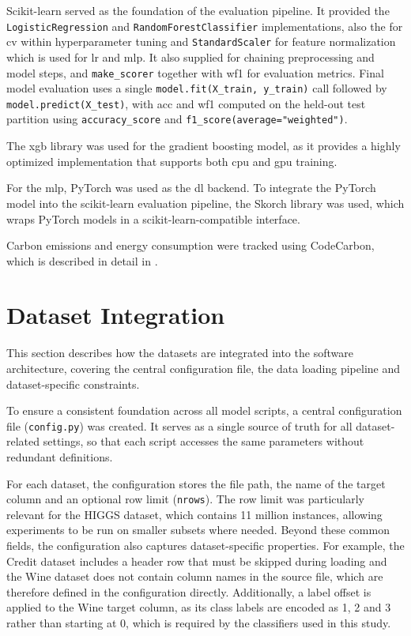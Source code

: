 Scikit-learn served as the foundation of the evaluation pipeline. It provided the \texttt{LogisticRegression} and \texttt{RandomForestClassifier} implementations, also the  for \gls{cv} within hyperparameter tuning and \texttt{StandardScaler} for feature normalization which is used for \gls{lr} and \gls{mlp}. It also supplied  for chaining preprocessing and model steps, and \texttt{make\_scorer} together with \gls{wf1} for evaluation metrics. Final model evaluation uses a single \texttt{model.fit(X\_train, y\_train)} call followed by \texttt{model.predict(X\_test)}, with \gls{acc} and \gls{wf1} computed on the held-out test partition using \texttt{accuracy\_score} and \texttt{f1\_score(average="weighted")}.

The \gls{xgb} library was used for the gradient boosting model, as it provides a highly optimized implementation that supports both \gls{cpu} and \gls{gpu} training.

For the \gls{mlp}, PyTorch \cite{paszkePyTorchImperativeStyle2019} was used as the \gls{dl} backend. To integrate the PyTorch model into the scikit-learn evaluation pipeline, the Skorch library \cite{ghoshSkorchBridgePyTorch2024} was used, which wraps PyTorch models in a scikit-learn-compatible interface.

Carbon emissions and energy consumption were tracked using CodeCarbon, which is described in detail in .

\section{Dataset Integration}
\label{implementation_datasets}

This section describes how the datasets are integrated into the software architecture, covering the central configuration file, the data loading pipeline and dataset-specific constraints.

To ensure a consistent foundation across all model scripts, a central configuration 
file (\texttt{config.py}) was created. It serves as a single source of truth for 
all dataset-related settings, so that each script accesses the same parameters 
without redundant definitions.

For each dataset, the configuration stores the file path, the name of the target 
column and an optional row limit (\texttt{nrows}). The row limit was particularly 
relevant for the HIGGS dataset, which contains 11 million instances, allowing 
experiments to be run on smaller subsets where needed. Beyond these common fields, 
the configuration also captures dataset-specific properties. For example, the Credit 
dataset includes a header row that must be skipped during loading and the Wine 
dataset does not contain column names in the source file, which are therefore defined 
in the configuration directly. Additionally, a label offset is applied to the Wine 
target column, as its class labels are encoded as 1, 2 and 3 rather than starting 
at 0, which is required by the classifiers used in this study.

